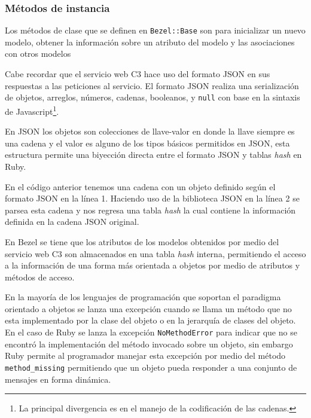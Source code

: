 \subsubsection{Métodos de instancia}

Los métodos de clase que se definen en \texttt{Bezel::Base} son para
inicializar un nuevo modelo, obtener la información sobre un atributo
del modelo y las asociaciones con otros modelos

Cabe recordar que el servicio web C3 hace uso del formato JSON en sus
respuestas a las peticiones al servicio. El formato JSON realiza una serialización
de objetos, arreglos, números, cadenas, booleanos, y \texttt{null} con base en la
sintaxis de Javascript\footnote{La principal divergencia es en el manejo de la
codificación de las cadenas.}.

En JSON los objetos son colecciones de llave-valor en donde la llave siempre
es una cadena y el valor es alguno de los tipos básicos permitidos en JSON, esta
estructura permite una biyección directa entre el formato JSON y tablas \textit{hash}
en Ruby.



En el código anterior tenemos una cadena con un objeto definido según el formato
JSON en la línea 1. Haciendo uso de la biblioteca JSON en la línea 2 se parsea
esta cadena y nos regresa una tabla \textit{hash} la cual contiene la información
definida en la cadena JSON original.

En Bezel se tiene que los atributos de los modelos obtenidos por medio del servicio
web C3 son almacenados en una tabla \textit{hash} interna, permitiendo el acceso
a la información de una forma más orientada a objetos por medio de atributos
y métodos de acceso.



En la mayoría de los lenguajes de programación que soportan el paradigma orientado
a objetos se lanza una excepción cuando se llama un método que no esta implementado
por la clase del objeto o en la jerarquía de clases del objeto. En el caso de Ruby
se lanza la excepción \texttt{NoMethodError} para indicar que no se encontró la
implementación del método invocado sobre un objeto, sin embargo Ruby permite al
programador manejar esta excepción por medio del método \texttt{method\_missing}
permitiendo que un objeto pueda responder a una conjunto de mensajes en forma
dinámica.

\vspace{2.5mm}

